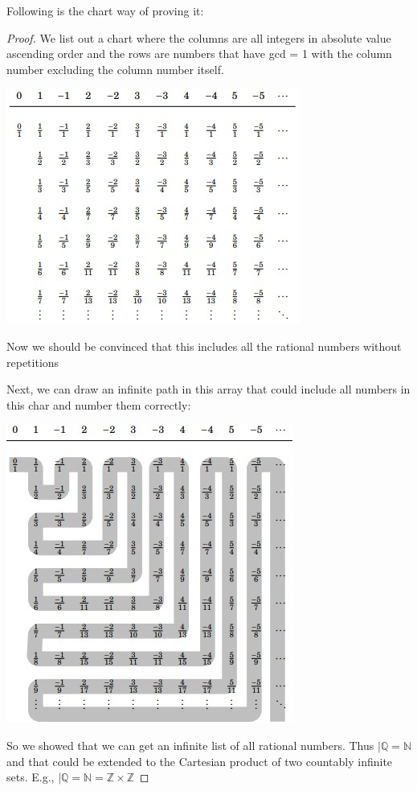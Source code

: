 \documentclass[letterpaper,12pt]{article}
\begin{document}
Following is the chart way of proving it: 
\begin{proof}
    We list out a chart where the columns are all integers in absolute value ascending order and the rows are numbers that have gcd = 1 with the column number excluding the column number itself. 
    
    \includegraphics*{./Image/Cardinality Chart proof.jpg}

    Now we should be convinced that this includes all the rational numbers without repetitions

    Next, we can draw an infinite path in this array that could include all numbers in this char and number them correctly:

    \includegraphics*{./Image/Cardinality chart path.jpg}

    So we showed that we can get an infinite list of all rational numbers. Thus $|\mathbb{Q}=\mathbb{N}$ and that could be extended to the Cartesian product of two countably infinite sets. E.g., $|\mathbb{Q}=\mathbb{N}=\mathbb{Z}\times \mathbb{Z}$
\end{proof}
\end{document}
